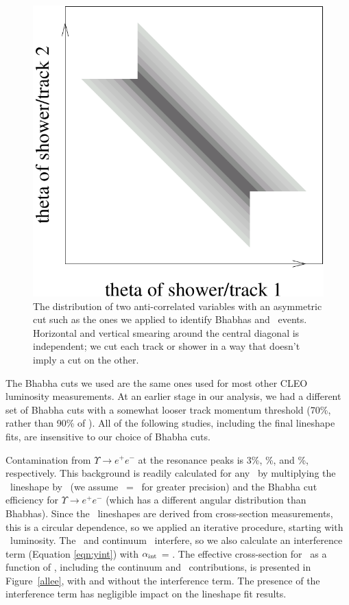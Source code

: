 \documentclass{cornell}
\begin{document}
\begin{figure}[p]
  \begin{center}
    \includegraphics[width=0.4\linewidth]{plots/asymmetriccartoon}
  \end{center}
  \caption{\label{asymmetriccartoon} The distribution of two
  anti-correlated variables with an asymmetric cut such as the ones we
  applied to identify Bhabhas and \gamgam\ events.  Horizontal and
  vertical smearing around the central diagonal is independent; we cut
  each track or shower in a way that doesn't imply a cut on the
  other.}
\end{figure}

The Bhabha cuts we used are the same ones used for most other CLEO
luminosity measurements.  At an earlier stage in our analysis, we had
a different set of Bhabha cuts with a somewhat looser track momentum
threshold (70\%, rather than 90\% of \ecm).  All of the following
studies, including the final lineshape fits, are insensitive to our
choice of Bhabha cuts.

Contamination from $\Upsilon \to e^+e^-$ at the resonance peaks is
3\%, \bork\%, and \bork\%, respectively.  This background is readily
calculated for any \ecm\ by multiplying the \ups\ lineshape by \bee\
(we assume \bee\ = \bmm\ for greater precision) and the Bhabha cut
efficiency for $\Upsilon \to e^+e^-$ (which has a different angular
distribution than Bhabhas).  Since the \ups\ lineshapes are derived
from cross-section measurements, this is a circular dependence, so we
applied an iterative procedure, starting with \gamgam\ luminosity.
The \ups\ and continuum \ee\ interfere, so we also calculate an
interference term (Equation \ref{eqn:yint}) with $\alpha_{\mbox{\scriptsize int}}$ =
\bork.  The effective cross-section for \ee\ as a function of \ecm,
including the continuum and \ups\ contributions, is presented in
Figure~\ref{allee}, with and without the interference term.  The
presence of the interference term has negligible impact on the
lineshape fit results.
\end{document}
